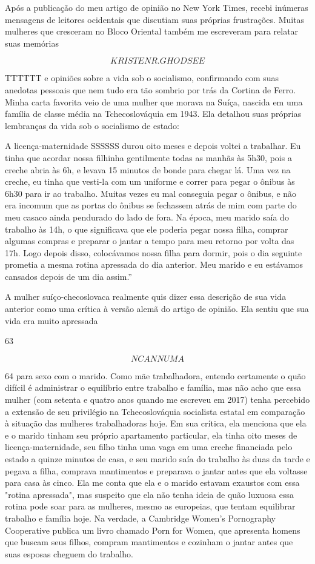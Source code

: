  \par 
Após a publicação do meu artigo de opinião no New York Times, recebi inúmeras mensagens de leitores ocidentais que discutiam suas próprias frustrações. Muitas mulheres que cresceram no Bloco Oriental também me escreveram para relatar suas memórias
 \par 
\[KRISTEN R. GHODSEE\]
 \par 
TTTTTT e opiniões sobre a vida sob o socialismo, confirmando com suas anedotas pessoais que nem tudo era tão sombrio por trás da Cortina de Ferro. Minha carta favorita veio de uma mulher que morava na Suíça, nascida em uma família de classe média na Tchecoslováquia em 1943. Ela detalhou suas próprias lembranças da vida sob o socialismo de estado:
 \par 
A licença-maternidade SSSSSS durou oito meses e depois voltei a trabalhar. Eu tinha que acordar nossa filhinha gentilmente todas as manhãs às 5h30, pois a creche abria às 6h, e levava {\color{blue}15} minutos de bonde para chegar lá. Uma vez na creche, eu tinha que vesti-la com um uniforme e correr para pegar o ônibus às 6h30 para ir ao trabalho. Muitas vezes eu mal conseguia pegar o ônibus, e não era incomum que as portas do ônibus se fechassem atrás de mim com parte do meu casaco ainda pendurado do lado de fora. Na época, meu marido saía do trabalho às 14h, o que significava que ele poderia pegar nossa filha, comprar algumas compras e preparar o jantar a tempo para meu retorno por volta das 17h. Logo depois disso, colocávamos nossa filha para dormir, pois o dia seguinte prometia a mesma rotina apressada do dia anterior. Meu marido e eu estávamos cansados ​​depois de um dia assim.”
 \par 
A mulher suíço-checoslovaca realmente quis dizer essa descrição de sua vida anterior como uma crítica à versão alemã do artigo de opinião. Ela sentiu que sua vida era muito apressada
 \par 
63
 \par 
\[NC ANN UMA\]
 \par 
64 para sexo com o marido. Como mãe trabalhadora, entendo certamente o quão difícil é administrar o equilíbrio entre trabalho e família, mas não acho que essa mulher (com setenta e quatro anos quando me escreveu em 2017) tenha percebido a extensão de seu privilégio na Tchecoslováquia socialista estatal em comparação à situação das mulheres trabalhadoras hoje. Em sua crítica, ela menciona que ela e o marido tinham seu próprio apartamento particular, ela tinha oito meses de licença-maternidade, seu filho tinha uma vaga em uma creche financiada pelo estado a quinze minutos de casa, e seu marido saía do trabalho às duas da tarde e pegava a filha, comprava mantimentos e preparava o jantar antes que ela voltasse para casa às cinco. Ela me conta que ela e o marido estavam exaustos com essa "rotina apressada", mas suspeito que ela não tenha ideia de quão luxuosa essa rotina pode soar para as mulheres, mesmo as europeias, que tentam equilibrar trabalho e família hoje. Na verdade, a Cambridge Women’s Pornography Cooperative publica um livro chamado Porn for Women, que apresenta homens que buscam seus filhos, compram mantimentos e cozinham o jantar antes que suas esposas cheguem do trabalho.
